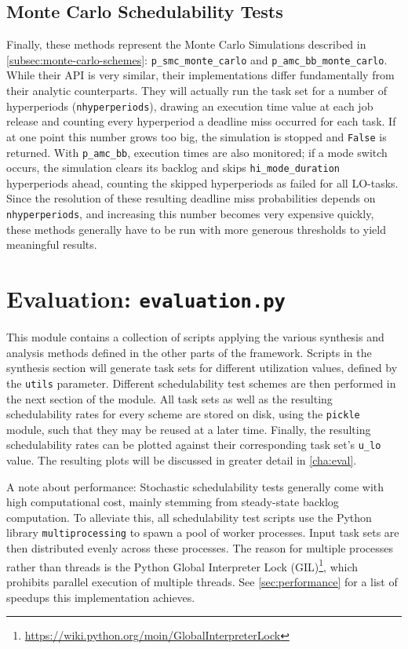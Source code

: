 \documentclass[a4paper,oneside]{csthesis}
\begin{document}
\subsection{Monte Carlo Schedulability Tests}
Finally, these methods represent the Monte Carlo Simulations described in \cref{subsec:monte-carlo-schemes}: \texttt{p\_smc\_monte\_carlo} and \texttt{p\_amc\_bb\_monte\_carlo}. While their API is very similar, their implementations differ fundamentally from their analytic counterparts. They will actually run the task set for a number of hyperperiods (\texttt{nhyperperiods}), drawing an execution time value at each job release and counting every hyperperiod a deadline miss occurred for each task. If at one point this number grows too big, the simulation is stopped and \texttt{False} is returned. With \texttt{p\_amc\_bb}, execution times are also monitored; if a mode switch occurs, the simulation clears its backlog and skips \texttt{hi\_mode\_duration} hyperperiods ahead, counting the skipped hyperperiods as failed for all LO-tasks. Since the resolution of these resulting deadline miss probabilities depends on \texttt{nhyperperiods}, and increasing this number becomes very expensive quickly, these methods generally have to be run with more generous thresholds to yield meaningful results.

\section{Evaluation: \texttt{evaluation.py}}
\label{sec:eval-mod}
This module contains a collection of scripts applying the various synthesis and analysis methods defined in the other parts of the framework. Scripts in the synthesis section will generate task sets for different utilization values, defined by the \texttt{utils} parameter. Different schedulability test schemes are then performed in the next section of the module. All task sets as well as the resulting schedulability rates for every scheme are stored on disk, using the \texttt{pickle} module, such that they may be reused at a later time. Finally, the resulting schedulability rates can be plotted against their corresponding task set's \texttt{u\_lo} value. The resulting plots will be discussed in greater detail in \cref{cha:eval}.

A note about performance: Stochastic schedulability tests generally come with high computational cost, mainly stemming from steady-state backlog computation. To alleviate this, all schedulability test scripts use the Python library \texttt{multiprocessing} to spawn a pool of worker processes. Input task sets are then distributed evenly across these processes. The reason for multiple processes rather than threads is the Python Global Interpreter Lock (GIL)\footnote{\url{https://wiki.python.org/moin/GlobalInterpreterLock}}, which prohibits parallel execution of multiple threads. See \cref{sec:performance} for a list of speedups this implementation achieves.
\end{document}
